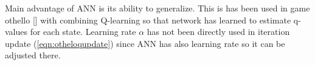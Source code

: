 Main advantage of ANN is its ability to generalize. This is has been used
in game othello [\cite{othello}] with combining Q-learning so that network
has learned to estimate q-values for each state. Learning rate $\alpha$ has
not been directly used in iteration update (\ref{eqn:otheloqupdate}) since
ANN has also learning rate so it can be adjusted there.

